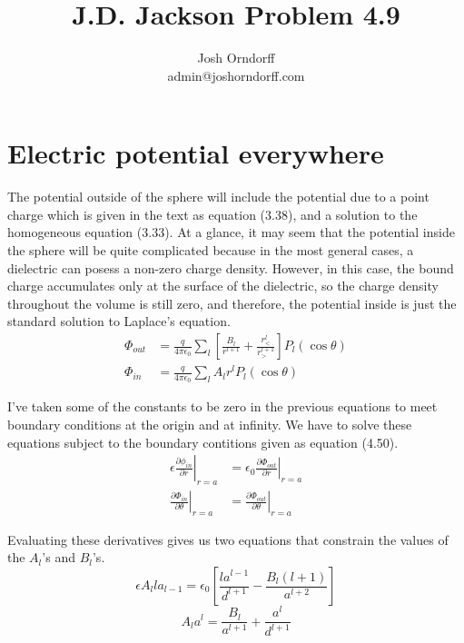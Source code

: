 \documentclass[10pt,a4paper]{article}
\begin{document}
\title{J.D. Jackson Problem 4.9}
\author{Josh Orndorff \\ admin@joshorndorff.com}
\maketitle

\section{Electric potential everywhere}
The potential outside of the sphere will include the potential due to a point charge which is given in the text as equation (3.38), and a solution to the homogeneous equation (3.33).  At a glance, it may seem that the potential inside the sphere will be quite complicated because in the most general cases, a dielectric can posess a non-zero charge density.  However, in this case, the bound charge accumulates only at the surface of the dielectric, so the charge density throughout the volume is still zero, and therefore, the potential inside is just the standard solution to Laplace's equation.
\begin{align}
\Phi_{out}&=\frac{q}{4\pi\epsilon_0}\sum_l\left[\frac{B_l}{r^{l+1}}+\frac{r_<^l}{r_>^{l+1}}\right]P_l(\cos\theta) \\
\Phi_{in} &=\frac{q}{4\pi\epsilon_0}\sum_lA_lr^lP_l(\cos\theta)
\end{align}

I've taken some of the constants to be zero in the previous equations to meet boundary conditions at the origin and at infinity.  We have to solve these equations subject to the boundary contitions given as equation (4.50).
\begin{align}
\left. \epsilon\frac{\partial \phi_{in}}{\partial r} \right|_{r=a} &= \left. \epsilon_0\frac{\partial \Phi_{out}}{\partial r}\right|_{r=a} \\
\left.\frac{\partial \Phi_{in}}{\partial \theta} \right|_{r=a} &= \left. \frac{\partial\Phi_{out}}{\partial \theta}\right|_{r=a}
\end{align}

Evaluating these derivatives gives us two equations that constrain the values of the $A_l$'s and $B_l$'s.
\begin{equation}
\epsilon A_l l a_{l-1}=\epsilon_0 \left[\frac{l a^{l-1}}{d^{l+1}}-\frac{B_l(l+1)}{a^{l+2}}\right]
\end{equation}
\begin{equation}
A_la^l=\frac{B_l}{a^{l+1}}+\frac{a^l}{d^{l+1}}
\end{equation}
\end{document}
